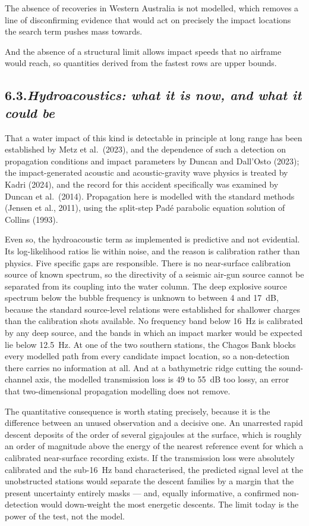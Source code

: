 \documentclass[12pt,a4paper]{article}
\begin{document}
The absence of recoveries in Western Australia is not modelled, which removes a line of
disconfirming evidence that would act on precisely the impact locations the search term pushes
mass towards.

And the absence of a structural limit allows impact speeds that no airframe would reach, so
quantities derived from the fastest rows are upper bounds.

\subsection*{6.3.\quad \textit{Hydroacoustics: what it is now, and what it could be}}

That a water impact of this kind is detectable in principle at long range has been established
by Metz et al.\ (2023), and the dependence of such a detection on propagation conditions and
impact parameters by Duncan and Dall'Osto (2023); the impact-generated acoustic and
acoustic-gravity wave physics is treated by Kadri (2024), and the record for this accident
specifically was examined by Duncan et al.\ (2014). Propagation here is modelled with the
standard methods (Jensen et al., 2011), using the split-step Pad\'e parabolic equation solution
of Collins (1993).

Even so, the hydroacoustic term as implemented is predictive and not evidential. Its log-likelihood ratios lie within
noise, and the reason is calibration rather than physics. Five specific gaps are responsible.
There is no near-surface calibration source of known spectrum, so the directivity of a seismic
air-gun source cannot be separated from its coupling into the water column. The deep explosive
source spectrum below the bubble frequency is unknown to between 4 and 17~dB, because the
standard source-level relations were established for shallower charges than the calibration shots
available. No frequency band below 16~Hz is calibrated by any deep source, and the bands in which
an impact marker would be expected lie below 12.5~Hz. At one of the two southern stations, the
Chagos Bank blocks every modelled path from every candidate impact location, so a non-detection
there carries no information at all. And at a bathymetric ridge cutting the sound-channel axis,
the modelled transmission loss is 49 to 55~dB too lossy, an error that two-dimensional
propagation modelling does not remove.

The quantitative consequence is worth stating precisely, because it is the difference between an
unused observation and a decisive one. An unarrested rapid descent deposits of the order of
several gigajoules at the surface, which is roughly an order of magnitude above the energy of the
nearest reference event for which a calibrated near-surface recording exists. If the
transmission loss were absolutely calibrated and the sub-16~Hz band characterised, the predicted
signal level at the unobstructed stations would separate the descent families by a margin that
the present uncertainty entirely masks --- and, equally informative, a confirmed non-detection
would down-weight the most energetic descents. The limit today is the power of the test, not the
model.
\end{document}
